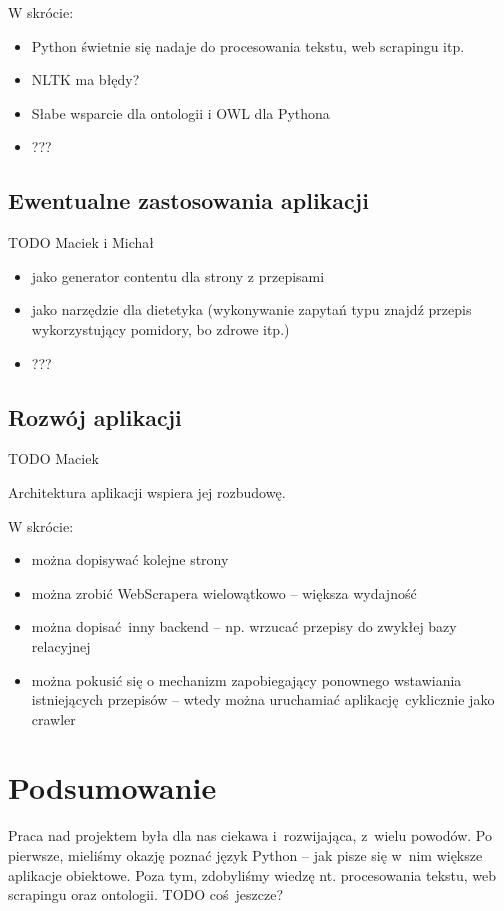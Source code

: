\documentclass[11pt,a4paper]{article}
\begin{document}
W skrócie: %
\begin{itemize}
  \item Python świetnie się nadaje do procesowania tekstu, web scrapingu itp.
  \item NLTK ma błędy? %
  \item Słabe wsparcie dla ontologii i OWL dla Pythona
  \item ???
\end{itemize}

\subsection{Ewentualne zastosowania aplikacji}
TODO Maciek i Michał
\begin{itemize}
  \item jako generator contentu dla strony z przepisami
  \item jako narzędzie dla dietetyka (wykonywanie zapytań typu znajdź przepis wykorzystujący pomidory, bo zdrowe itp.)
  \item ???
\end{itemize}

\subsection{Rozwój aplikacji}
TODO Maciek

Architektura aplikacji wspiera jej rozbudowę.

W skrócie: %
\begin{itemize}
  \item można dopisywać kolejne strony
  \item można zrobić WebScrapera wielowątkowo -- większa wydajność
  \item można dopisać inny backend -- np. wrzucać przepisy do zwykłej bazy relacyjnej
  \item można pokusić się o mechanizm zapobiegający ponownego wstawiania istniejących przepisów -- wtedy można uruchamiać aplikację cyklicznie jako crawler
\end{itemize}

\section{Podsumowanie}
Praca nad projektem była dla nas ciekawa i~rozwijająca, z~wielu powodów. Po pierwsze, mieliśmy okazję poznać język Python -- jak pisze się w~nim większe aplikacje obiektowe. Poza tym, zdobyliśmy wiedzę nt. procesowania tekstu, web scrapingu oraz ontologii. TODO coś jeszcze?

%
\end{document}
